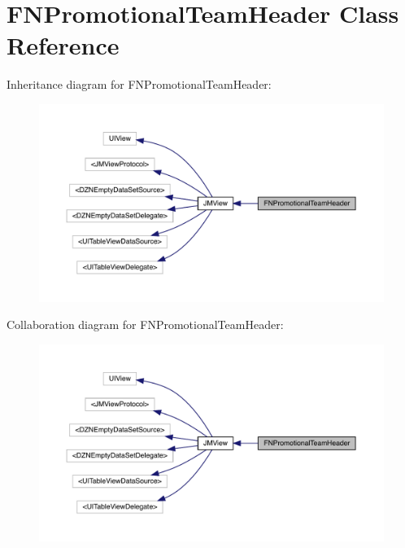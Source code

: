 \hypertarget{interface_f_n_promotional_team_header}{}\section{F\+N\+Promotional\+Team\+Header Class Reference}
\label{interface_f_n_promotional_team_header}


Inheritance diagram for F\+N\+Promotional\+Team\+Header\+:\nopagebreak
\begin{figure}[H]
\begin{center}
\leavevmode
\includegraphics[width=350pt]{interface_f_n_promotional_team_header__inherit__graph}
\end{center}
\end{figure}


Collaboration diagram for F\+N\+Promotional\+Team\+Header\+:\nopagebreak
\begin{figure}[H]
\begin{center}
\leavevmode
\includegraphics[width=350pt]{interface_f_n_promotional_team_header__coll__graph}
\end{center}
\end{figure}
